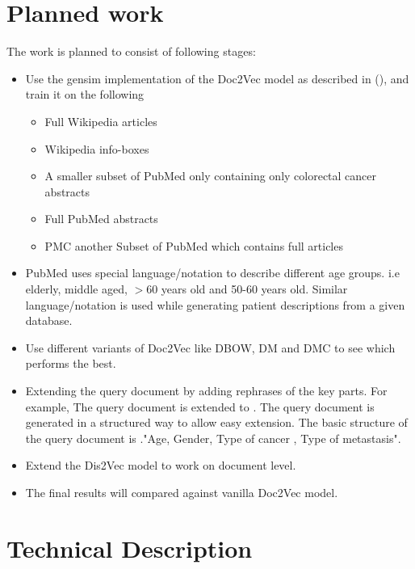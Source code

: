 \documentclass[12pt,a4paper] {article}
\begin{document}
\section*{Planned work} 
The work is planned to consist of following stages:
\begin{itemize}
	\item Use the gensim \cite{rehurek_lrec} implementation of the Doc2Vec model as described in (\cite{le2014distributed}), and train it on
	the following
	\begin{itemize}
		\item Full Wikipedia articles 
		\item Wikipedia info-boxes
		\item A smaller subset of PubMed only containing only  colorectal cancer abstracts
		\item Full PubMed abstracts
		\item PMC another Subset of PubMed which contains full articles
	\end{itemize}
	
	
	\item PubMed uses special language/notation to describe different age groups. i.e elderly, middle aged, $>$60 years old and 50-60 years old. Similar language/notation is used while generating patient descriptions from a given database.
	
	\item Use different variants of Doc2Vec like DBOW, DM and DMC to see which performs the best.

	\item Extending the query document by adding rephrases of the key parts. For example, The query document  is extended to . The query document is generated in a structured way to allow easy extension. The basic structure of the query document is ."Age, Gender, Type of cancer , Type of metastasis".   
	
	\item Extend the Dis2Vec \cite{ghosh2016characterizing} model to work on document level.
	\item The final results will compared against vanilla Doc2Vec model.
	
	
\end{itemize}



\section*{Technical Description} 
\end{document}
